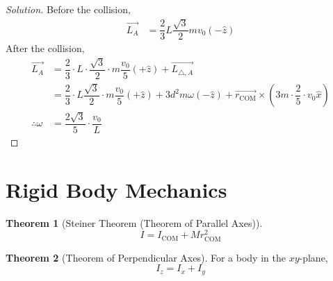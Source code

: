 \documentclass[fleqn, a4paper, 12pt]{article}
\theoremstyle{definition}
\theoremstyle{theorem}
\newtheorem{theorem}{Theorem}
\newenvironment{solution}
{\begin{proof}[Solution]\let\qed\relax}
	{\end{proof}}
\begin{document}
\begin{solution}
	Before the collision,
	\begin{align*}
		\overrightarrow{L_A} &= \dfrac{2}{3}L\dfrac{\sqrt{3}}{2} m v_0 (-\hat{z})
	\end{align*}
	After the collision,
	\begin{align*}
		\overrightarrow{L_A} &= \dfrac{2}{3} \cdot L \cdot \dfrac{\sqrt{3}}{2} \cdot m \dfrac{v_0}{5} \left( +\hat{z} \right) + \overrightarrow{L_{\triangle, A}}\\
		&= \dfrac{2}{3} \cdot L \dfrac{\sqrt{3}}{2} \cdot m \dfrac{v_0}{5} \left( +\hat{z} \right) + 3 d^2 m \omega \left( -\hat{z} \right) + \overrightarrow{r_{\text{COM}}} \times \left( 3m \cdot \dfrac{2}{5} \cdot v_0 \hat{x} \right)\\
		\therefore \omega &= \dfrac{2 \sqrt{3}}{5} \cdot \dfrac{v_0}{L}
	\end{align*}
\end{solution}

\section{Rigid Body Mechanics}

\begin{theorem}[Steiner Theorem (Theorem of Parallel Axes)]
	\begin{equation*}
		I = I_{\text{COM}} + M r^2_{\text{COM}}
	\end{equation*}
\end{theorem}

\begin{theorem}[Theorem of Perpendicular Axes]
	For a body in the $xy$-plane,
	\begin{equation*}
		I_z = I_x + I_y
	\end{equation*}
\end{theorem}
\end{document}
